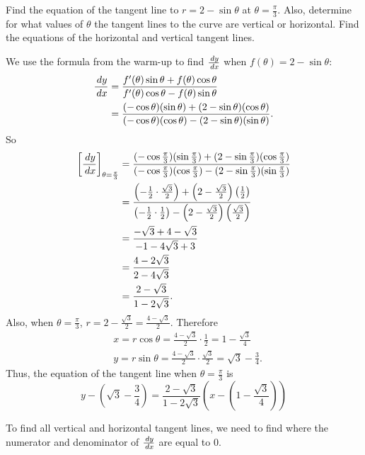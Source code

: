 \documentclass[noinstructornotest]{ximera}
\begin{document}
\begin{problem}
Find the equation of the tangent line to $r = 2 - \sin \theta$ at $\theta = \frac{\pi}{3}$.  
Also, determine for what values of $\theta$ the tangent lines to the curve are vertical or horizontal.  Find the equations of the horizontal and vertical tangent lines.
	\begin{freeResponse}
	We use the formula from the warm-up to find $\frac{\,d y}{\,d x}$ when $f(\theta) = 2 - \sin \theta$:
		\begin{align*}
		\frac{\,d y}{\,d x}
		&= \frac{f'(\theta) \sin \theta + f(\theta) \cos \theta}{f'(\theta) \cos \theta - f(\theta) \sin \theta } \\
		&= \frac{(- \cos \theta)(\sin \theta) + (2 - \sin \theta)(\cos \theta)}{(-\cos \theta)(\cos \theta) - (2 - \sin \theta)(\sin \theta)}.
		\end{align*}
	So
		\begin{align*}
		\bigg[ \frac{\,d y}{\,d x} \bigg]_{\theta = \frac{\pi}{3}} 
		&= \frac{(- \cos \frac{\pi}{3})(\sin \frac{\pi}{3}) + (2 - \sin \frac{\pi}{3})(\cos \frac{\pi}{3})}{(-\cos \frac{\pi}{3})(\cos \frac{\pi}{3}) - (2 - \sin \frac{\pi}{3})(\sin \frac{\pi}{3})}  \\
		&= \frac{\left( - \frac{1}{2} \cdot \frac{\sqrt{3}}{2} \right) + \left( 2 - \frac{\sqrt{3}}{2} \right) \left( \frac{1}{2} \right)}{\left( - \frac{1}{2} \cdot \frac{1}{2} \right) - \left( 2 - \frac{\sqrt{3}}{2} \right) \left( \frac{\sqrt{3}}{2} \right)}  \\
		&= \frac{- \sqrt{3} + 4 - \sqrt{3}}{-1 - 4 \sqrt{3} + 3}  \\
		&= \frac{4 - 2 \sqrt{3}}{2 - 4 \sqrt{3}}  \\
		&= \frac{2 - \sqrt{3}}{1 - 2 \sqrt{3}}.
		\end{align*}
	Also, when $\theta = \frac{\pi}{3}$, $r = 2 - \frac{\sqrt{3}}{2} = \frac{4 - \sqrt{3}}{2}$.  
	Therefore
		\begin{align*}
		&x = r \cos \theta = \frac{4 - \sqrt{3}}{2} \cdot \frac{1}{2} = 1 - \frac{\sqrt{3}}{4}  \\
		&y = r \sin \theta = \frac{4 - \sqrt{3}}{2} \cdot \frac{\sqrt{3}}{2} = \sqrt{3} - \frac{3}{4}.
		\end{align*}
	Thus, the equation of the tangent line when $\theta = \frac{\pi}{3}$ is
		\[
		\boxed{y - \left( \sqrt{3} - \frac{3}{4} \right) = \frac{2 - \sqrt{3}}{1 - 2 \sqrt{3}} \left( x - \left( 1 - \frac{\sqrt{3}}{4} \right) \right)}
		\]
		
	To find all vertical and horizontal tangent lines, we need to find where the numerator and denominator of $\frac{\,d y}{\,d x}$ are equal to $0$.
	

\end{freeResponse}
\end{problem}
\end{document}
